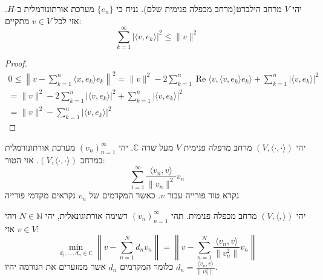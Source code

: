 \documentclass{tstextbook}
\begin{document}
\begin{proposition}
יהי \(V\) מרחב הילברט(מרחב מכפלה פנימית שלם). נניח כי \(\{ e_{n} \}\) מערכת אורתונורמלית ב-\(H\). אזי לכל \(v \in V\) מתקיים:
$$\sum_{k=1}^{\infty}|\langle v,e_{k}\rangle|^{2}\leq\|v\|^{2}$$

\end{proposition}
\begin{proof}
\begin{gather*}{0\leq\left\|v-\sum_{k=1}^{n}\langle x,e_{k}\rangle e_{k}\right\|^{2}=\|v\|^{2}-2\sum_{k=1}^{n}\operatorname{Re}\langle v,\langle v,e_{k}\rangle e_{k}\rangle+\sum_{k=1}^{n}|\langle v,e_{k}\rangle|^{2}}\\ {=\|v\|^{2}-2\sum_{k=1}^{n}|\langle v,e_{k}\rangle|^{2}+\sum_{k=1}^{n}|\langle v,e_{k}\rangle|^{2}}\\ {=\|v\|^{2}-\sum_{k=1}^{n}|\langle v,e_{k}\rangle|^{2}}\end{gather*}

\end{proof}
\begin{definition}
יהי \((V,\langle \cdot,\cdot \rangle)\) מרחב מרפלה פנימית \(V\) מעל שדה \(\mathbb{C}\). יהי \((v_{n})^{\infty}_{n=1}\) מערכת אורתונורמלית במרחב \((V,\langle \cdot,\cdot \rangle)\). אזי הטור:
$$\sum_{i=1}^{\infty} \frac{\langle v_{n},v \rangle}{\lVert v_{n} \rVert ^{2}}v_{n} $$
נקרא טור פורייה עבור \(v\). כאשר המקדמים של \(v_{n}\) נקראים מקדמי פורייה

\end{definition}
\begin{proposition}
יהי \((V,\langle , \rangle)\) מרחב מכפלה פנימית. תהי \((v_{n})_{n=1}^{\infty}\) רשימה אורתוגונאלית, יהי \(N \in \mathbb{N}\) ויהי \(v \in V\) אזי:
$$\min _{d_{1},\dots,d_{n}\in \mathbb{C}}\left\lVert  v-\sum_{n=1}^{N} d_{n}v_{n}  \right\rVert = \left\lVert  v-\sum_{n=1}^{N} \frac{\langle v_{n},v \rangle}{\lVert v_{n}^{2} \rVert }v_{n}   \right\rVert $$
כלומר המקדמים \(d_{n}\) אשר ממזערים את הנורמה יהיו \(d_{n}=\frac{\langle v_{n},v \rangle}{\lVert v_{n}^{2} \rVert}\).

\end{proposition}
\end{document}
